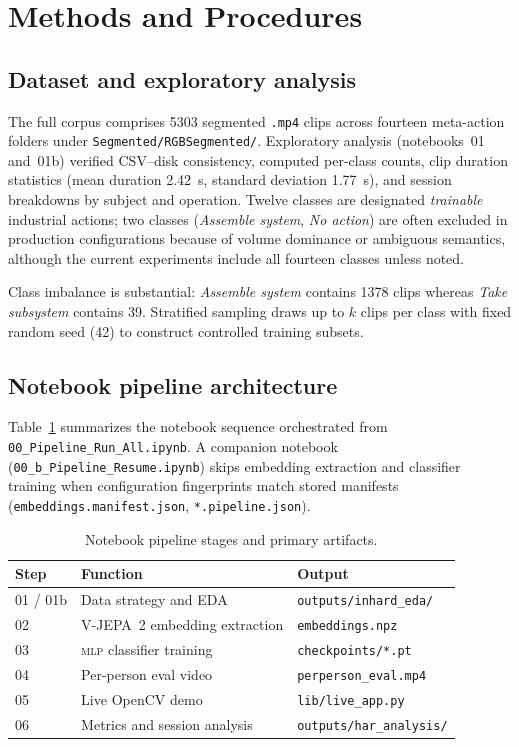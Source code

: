 \section{Methods and Procedures}
\label{sec:methods}

\subsection{Dataset and exploratory analysis}

The full \inhard{} corpus comprises \num{5303} segmented \texttt{.mp4} clips across fourteen meta-action folders under \texttt{Segmented/RGBSegmented/}.
Exploratory analysis (notebooks~01 and~01b) verified CSV--disk consistency, computed per-class counts, clip duration statistics (mean duration \SI{2.42}{\second}, standard deviation \SI{1.77}{\second}), and session breakdowns by subject and operation.
Twelve classes are designated \emph{trainable} industrial actions; two classes (\emph{Assemble system}, \emph{No action}) are often excluded in production configurations because of volume dominance or ambiguous semantics, although the current experiments include all fourteen classes unless noted.

Class imbalance is substantial: \emph{Assemble system} contains \num{1378} clips whereas \emph{Take subsystem} contains \num{39}.
Stratified sampling draws up to $k$ clips per class with fixed random seed (\num{42}) to construct controlled training subsets.

\subsection{Notebook pipeline architecture}

Table~\ref{tab:pipeline} summarizes the notebook sequence orchestrated from \texttt{00\_Pipeline\_Run\_All.ipynb}.
A companion notebook (\texttt{00\_b\_Pipeline\_Resume.ipynb}) skips embedding extraction and classifier training when configuration fingerprints match stored manifests (\texttt{embeddings.manifest.json}, \texttt{*.pipeline.json}).

\begin{table}[htbp]
\centering
\caption{Notebook pipeline stages and primary artifacts.}
\label{tab:pipeline}
\begin{tabularx}{\linewidth}{@{}l X l@{}}
\toprule
Step & Function & Output \\
\midrule
01 / 01b & Data strategy and \inhard{} EDA & \texttt{outputs/inhard\_eda/} \\
02 & V-JEPA~2 embedding extraction & \texttt{embeddings.npz} \\
03 & \textsc{mlp} classifier training & \texttt{checkpoints/*.pt} \\
04 & Per-person eval video & \texttt{perperson\_eval.mp4} \\
05 & Live OpenCV demo & \texttt{lib/live\_app.py} \\
06 & Metrics and session analysis & \texttt{outputs/har\_analysis/} \\
\bottomrule
\end{tabularx}
\end{table}

